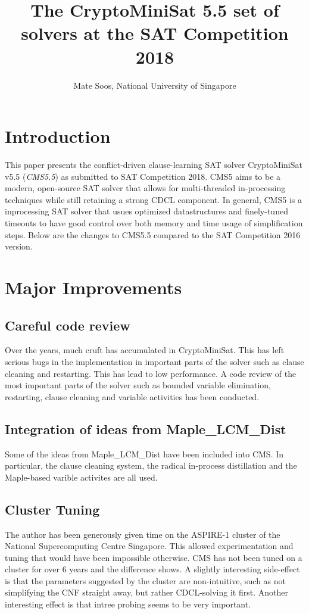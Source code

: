\documentclass[final]{ieee}
\begin{document}
\title{The CryptoMiniSat 5.5 set of solvers at the SAT Competition 2018}
\author{Mate Soos, National University of Singapore}

\maketitle
\thispagestyle{empty}
\pagestyle{empty}

\section{Introduction}
This paper presents the conflict-driven clause-learning SAT solver CryptoMiniSat v5.5 (\emph{CMS5.5}) as submitted to SAT Competition 2018. CMS5 aims to be a modern, open-source SAT solver that allows for multi-threaded in-processing techniques while still retaining a strong CDCL component. In general, CMS5 is a inprocessing SAT solver that usues optimized datastructures and finely-tuned timeouts to have good control over both memory and time usage of simplification steps. Below are the changes to CMS5.5 compared to the SAT Competition 2016 version.

\section{Major Improvements}
\subsection{Careful code review}
Over the years, much cruft has accumulated in CryptoMiniSat. This has left serious bugs in the implementation in important parts of the solver such as clause cleaning and restarting. This has lead to low performance. A code review of the most important parts of the solver such as bounded variable elimination, restarting, clause cleaning and variable activities has been conducted.

\subsection{Integration of ideas from Maple\_LCM\_Dist}
Some of the ideas from Maple\_LCM\_Dist\cite{maple} have been included into CMS. In particular, the clause cleaning system, the radical in-process distillation and the Maple-based varible activites are all used.

\subsection{Cluster Tuning}
The author has been generously given time on the ASPIRE-1 cluster of the National Supercomputing Centre Singapore\cite{nscc}. This allowed experimentation and tuning that would have been impossible otherwise. CMS has not been tuned on a cluster for over 6 years and the difference shows. A slightly interesting side-effect is that the parameters suggested by the cluster are non-intuitive, such as not simplifying the CNF straight away, but rather CDCL-solving it first. Another interesting effect is that intree probing\cite{HeuleJB13} seems to be very important.
\end{document}
